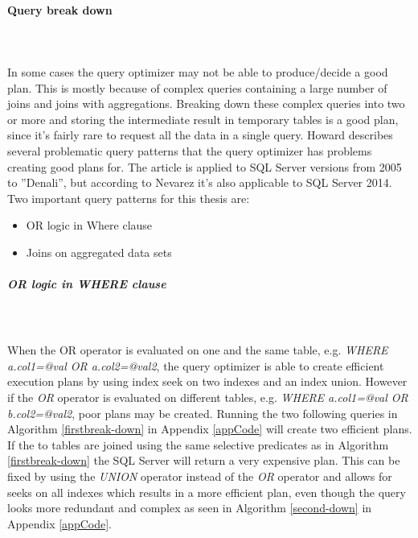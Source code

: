 \documentclass{cslthse-msc}
\begin{document}
\paragraph*{Query break down}\mbox{}\\\\ \label{querybreakdown}
In some cases the query optimizer may not be able to produce/decide a good plan. This is mostly because of complex queries containing a large number of joins and joins with aggregations. Breaking down these complex queries into two or more and storing the intermediate result in temporary tables is a good plan, since it's fairly rare to request all the data in a single query. 
Howard   \cite{break-down} describes several problematic query patterns that the query optimizer has problems creating good plans for. The article is applied to SQL Server versions from 2005 to ''Denali'', but according to Nevarez   \cite{Nevarez} it's also applicable to SQL Server 2014.\\ Two important query patterns for this thesis are:
\begin{itemize}
\item OR logic in Where clause
\item Joins on aggregated data sets
\end{itemize}

\subparagraph{\textit{OR} logic in \textit{WHERE} clause}\mbox{}\\\\
When the OR operator is evaluated on one and the same table, e.g. \textit{WHERE a.col1=@val OR a.col2=@val2}, the query optimizer is able to create efficient execution plans by using index seek on two indexes and an index union. However if the \textit{OR} operator is evaluated on different tables, e.g. \textit{WHERE a.col1=@val OR b.col2=@val2}, poor plans may be created. Running the two following queries in Algorithm \ref{firstbreak-down} in Appendix \ref{appCode} will create two efficient plans.\\

If the to tables are joined using the same selective predicates as in Algorithm \ref{firstbreak-down} the SQL Server will return a very expensive plan. This can be fixed by using the \textit{UNION} operator instead of the \textit{OR} operator and allows for seeks on all indexes which results in a more efficient plan, even though the query looks more redundant and complex as seen in Algorithm \ref{second-down} in Appendix \ref{appCode}.
\end{document}
